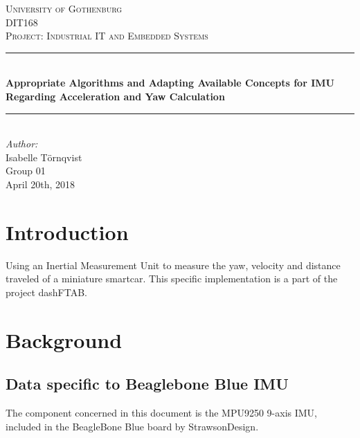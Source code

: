 \documentclass[12pt]{article}
\begin{document}
\begin{titlepage}

\newcommand{\Line}{\rule{\linewidth}{0.5mm}} 

\center
 
\textsc{\LARGE University of Gothenburg}
\\[3.5cm] 

\textsc{\Large DIT168}\\[0.3cm]
\textsc{\large Project: Industrial IT and Embedded Systems}\\[0.5cm]

\Line \\[0.4cm]
{\huge \bfseries  Appropriate Algorithms and Adapting Available Concepts for IMU Regarding Acceleration and Yaw Calculation}\\[0.4cm]
\Line \\[0.5cm]
 
\Large \textit{Author:}
\\Isabelle Törnqvist
 \\[4cm]

{\large Group 01} \\[0.2cm]
{\large April 20th, 2018}


\end{titlepage}

\tableofcontents
\pagebreak

\section{Introduction} 
Using an Inertial Measurement Unit to measure the yaw, velocity and distance traveled of a miniature smartcar. This specific implementation is a part of the project dashFTAB\cite{gitrepo}. 
\section{Background}
\subsection{Data specific to Beaglebone Blue IMU}
The component concerned in this document is the MPU9250 9-axis IMU, included in the BeagleBone Blue board by StrawsonDesign\cite{strawson}.  
\vspace{5mm} %
\end{document}
